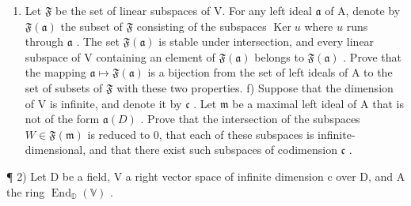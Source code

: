 \begin{enumerate}
\def\labelenumi{\alph{enumi})}
\setcounter{enumi}{4}
\tightlist
\item
  Let \(\mathfrak{F}\) be the set of linear subspaces of V. For any left ideal \(\mathfrak{a}\) of A, denote by \(\mathfrak{F}(\mathfrak{a})\) the subset of \(\mathfrak{F}\) consisting of the subspaces \(\operatorname{Ker} u\) where \(u\) runs through \(\mathfrak{a}\) . The set \(\mathfrak{F}(\mathfrak{a})\) is stable under intersection, and every linear subspace of V containing an element of \(\mathfrak{F}(\mathfrak{a})\) belongs to \(\mathfrak{F}(\mathfrak{a})\) . Prove that the mapping \(\mathfrak{a} \mapsto \mathfrak{F}(\mathfrak{a})\) is a bijection from the set of left ideals of A to the set of subsets of \(\mathfrak{F}\) with these two properties. f) Suppose that the dimension of V is infinite, and denote it by \(\mathfrak{c}\) . Let \(\mathfrak{m}\) be a maximal left ideal of A that is not of the form \(\mathfrak{a}(D)\) . Prove that the intersection of the subspaces \(W \in \mathfrak{F}(\mathfrak{m})\) is reduced to 0, that each of these subspaces is infinite-dimensional, and that there exist such subspaces of codimension \(\mathfrak{c}\) .
\end{enumerate}

¶ 2) Let D be a field, V a right vector space of infinite dimension c over D, and A the ring \(\operatorname{End}_{\mathbb{D}}(\mathbb{V})\) .

